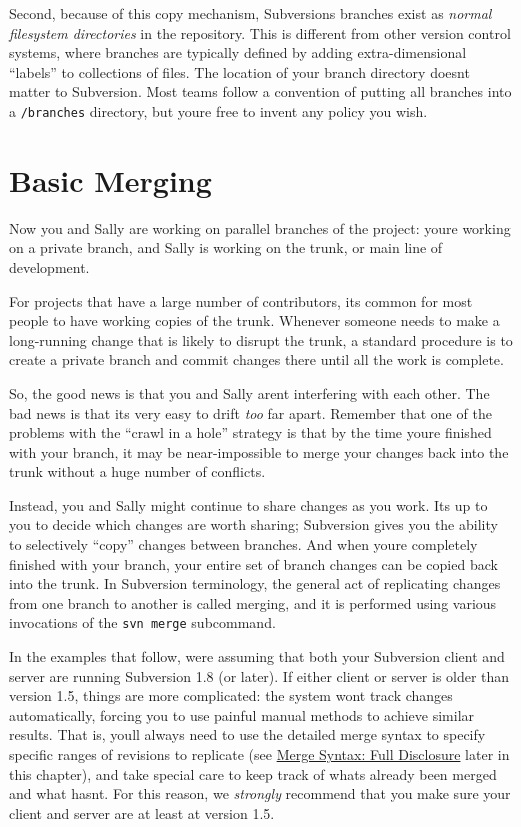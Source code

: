 Second, because of this copy mechanism, Subversion\textquotesingle s
branches exist as \emph{normal filesystem directories} in the
repository. This is different from other version control systems, where
branches are typically defined by adding extra-dimensional ``labels'' to
collections of files. The location of your branch directory
doesn\textquotesingle t matter to Subversion. Most teams follow a
convention of putting all branches into a \texttt{/branches} directory,
but you\textquotesingle re free to invent any policy you wish.

\section{Basic Merging}\label{svn.branchmerge.basicmerging}

Now you and Sally are working on parallel branches of the project:
you\textquotesingle re working on a private branch, and Sally is working
on the trunk, or main line of development.

For projects that have a large number of contributors,
it\textquotesingle s common for most people to have working copies of
the trunk. Whenever someone needs to make a long-running change that is
likely to disrupt the trunk, a standard procedure is to create a private
branch and commit changes there until all the work is complete.

So, the good news is that you and Sally aren\textquotesingle t
interfering with each other. The bad news is that it\textquotesingle s
very easy to drift \emph{too} far apart. Remember that one of the
problems with the ``crawl in a hole'' strategy is that by the time
you\textquotesingle re finished with your branch, it may be
near-impossible to merge your changes back into the trunk without a huge
number of conflicts.

Instead, you and Sally might continue to share changes as you work.
It\textquotesingle s up to you to decide which changes are worth
sharing; Subversion gives you the ability to selectively ``copy''
changes between branches. And when you\textquotesingle re completely
finished with your branch, your entire set of branch changes can be
copied back into the trunk. In Subversion terminology, the general act
of replicating changes from one branch to another is called merging, and
it is performed using various invocations of the \texttt{svn\ merge}
subcommand.

In the examples that follow, we\textquotesingle re assuming that both
your Subversion client and server are running Subversion 1.8 (or later).
If either client or server is older than version 1.5, things are more
complicated: the system won\textquotesingle t track changes
automatically, forcing you to use painful manual methods to achieve
similar results. That is, you\textquotesingle ll always need to use the
detailed merge syntax to specify specific ranges of revisions to
replicate (see \hyperref[svn.branchmerge.advanced.advancedsyntax]{Merge
Syntax: Full Disclosure} later in this chapter), and take special care
to keep track of what\textquotesingle s already been merged and what
hasn\textquotesingle t. For this reason, we \emph{strongly} recommend
that you make sure your client and server are at least at version 1.5.


